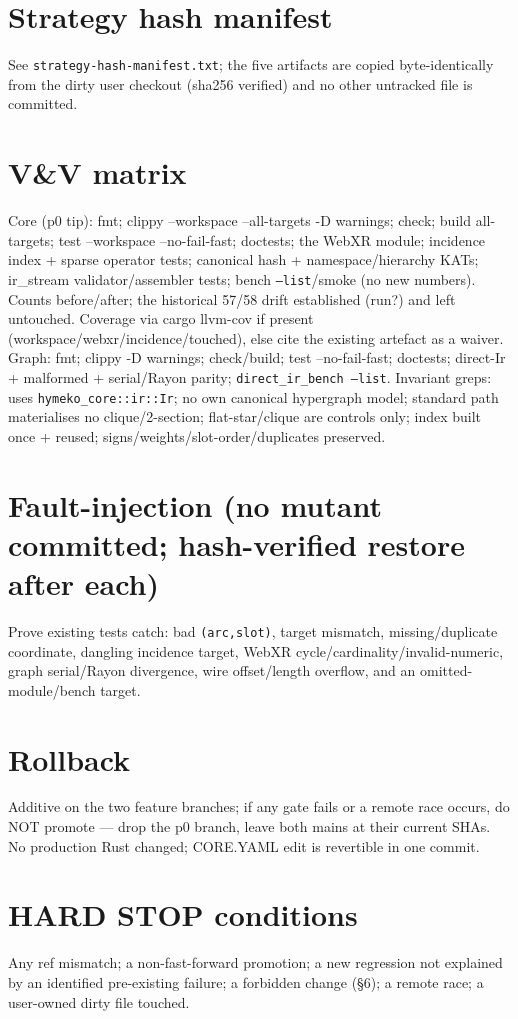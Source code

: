 \documentclass[11pt]{article}
\begin{document}
\section*{Strategy hash manifest}
See \texttt{strategy-hash-manifest.txt}; the five artifacts are copied byte-identically from the dirty
user checkout (sha256 verified) and no other untracked file is committed.
\section*{V\&V matrix}
Core (p0 tip): fmt; clippy --workspace --all-targets -D warnings; check; build all-targets; test
--workspace --no-fail-fast; doctests; the WebXR module; incidence index + sparse operator tests; canonical
hash + namespace/hierarchy KATs; ir\_stream validator/assembler tests; bench \texttt{--list}/smoke (no new
numbers). Counts before/after; the historical 57/58 drift established (run?) and left untouched. Coverage
via cargo llvm-cov if present (workspace/webxr/incidence/touched), else cite the existing artefact as a
waiver. Graph: fmt; clippy -D warnings; check/build; test --no-fail-fast; doctests; direct-Ir + malformed
+ serial/Rayon parity; \texttt{direct\_ir\_bench --list}. Invariant greps: uses \texttt{hymeko\_core::ir::Ir};
no own canonical hypergraph model; standard path materialises no clique/2-section; flat-star/clique are
controls only; index built once + reused; signs/weights/slot-order/duplicates preserved.
\section*{Fault-injection (no mutant committed; hash-verified restore after each)}
Prove existing tests catch: bad \texttt{(arc,slot)}, target mismatch, missing/duplicate coordinate,
dangling incidence target, WebXR cycle/cardinality/invalid-numeric, graph serial/Rayon divergence, wire
offset/length overflow, and an omitted-module/bench target.
\section*{Rollback}
Additive on the two feature branches; if any gate fails or a remote race occurs, do NOT promote --- drop
the p0 branch, leave both mains at their current SHAs. No production Rust changed; CORE.YAML edit is
revertible in one commit.
\section*{HARD STOP conditions}
Any ref mismatch; a non-fast-forward promotion; a new regression not explained by an identified
pre-existing failure; a forbidden change (§6); a remote race; a user-owned dirty file touched.
\end{document}
